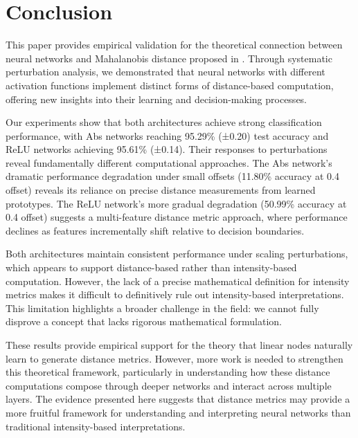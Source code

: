\section{Conclusion}

This paper provides empirical validation for the theoretical connection between neural networks and Mahalanobis distance proposed in \cite{oursland2024interpreting}. Through systematic perturbation analysis, we demonstrated that neural networks with different activation functions implement distinct forms of distance-based computation, offering new insights into their learning and decision-making processes.

Our experiments show that both architectures achieve strong classification performance, with Abs networks reaching 95.29\% (±0.20) test accuracy and ReLU networks achieving 95.61\% (±0.14). Their responses to perturbations reveal fundamentally different computational approaches. The Abs network's dramatic performance degradation under small offsets (11.80\% accuracy at 0.4 offset) reveals its reliance on precise distance measurements from learned prototypes. The ReLU network's more gradual degradation (50.99\% accuracy at 0.4 offset) suggests a multi-feature distance metric approach, where performance declines as features incrementally shift relative to decision boundaries.

Both architectures maintain consistent performance under scaling perturbations, which appears to support distance-based rather than intensity-based computation. However, the lack of a precise mathematical definition for intensity metrics makes it difficult to definitively rule out intensity-based interpretations. This limitation highlights a broader challenge in the field: we cannot fully disprove a concept that lacks rigorous mathematical formulation.

These results provide empirical support for the theory that linear nodes naturally learn to generate distance metrics. However, more work is needed to strengthen this theoretical framework, particularly in understanding how these distance computations compose through deeper networks and interact across multiple layers. The evidence presented here suggests that distance metrics may provide a more fruitful framework for understanding and interpreting neural networks than traditional intensity-based interpretations.